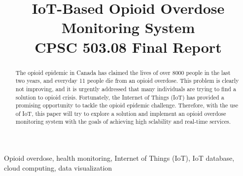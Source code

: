 \documentclass[conference]{IEEEtran}
\begin{document}
\title{\huge IoT-Based Opioid Overdose Monitoring System\\
{\LARGE CPSC 503.08 Final Report}
}

\author{
\and
{}
}

\maketitle

\begin{abstract}
The opioid epidemic in Canada has claimed the lives of over 8000 people in the last two years, and everyday 11 people die from an opioid overdose. This problem is clearly not improving, and it is urgently addressed that many individuals are trying to find a solution to opioid crisis. Fortunately, the Internet of Things (IoT) has provided a promising opportunity to tackle the opioid epidemic challenge. Therefore, with the use of IoT, this paper will try to explore a solution and implement an opioid overdose monitoring system with the goals of achieving high sclability and real-time services.
\end{abstract}

\begin{IEEEkeywords}
Opioid overdose, health monitoring, Internet of Things (IoT), IoT database, cloud computing, data visualization
\end{IEEEkeywords}
\end{document}

